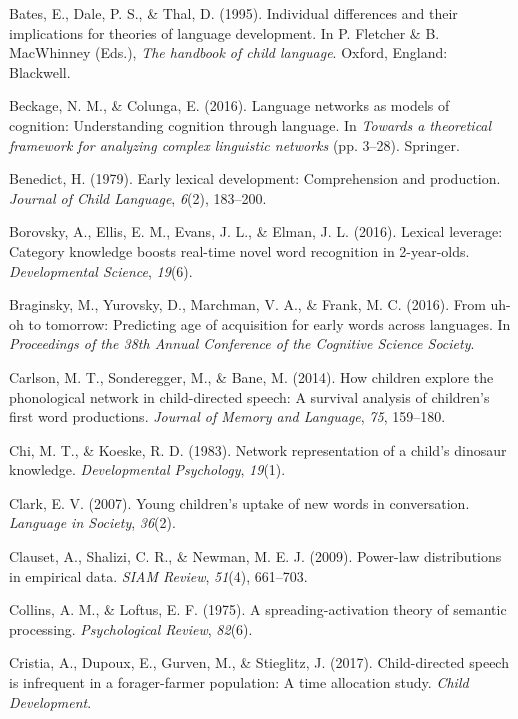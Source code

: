 \documentclass[english,floatsintext,man]{apa6}
\theoremstyle{definition}
\theoremstyle{definition}
\theoremstyle{definition}
\theoremstyle{remark}
\begin{document}
\hypertarget{ref-bates1995}{}
Bates, E., Dale, P. S., \& Thal, D. (1995). Individual differences and
their implications for theories of language development. In P. Fletcher
\& B. MacWhinney (Eds.), \emph{The handbook of child language}. Oxford,
England: Blackwell.

\hypertarget{ref-beckage2016}{}
Beckage, N. M., \& Colunga, E. (2016). Language networks as models of
cognition: Understanding cognition through language. In \emph{Towards a
theoretical framework for analyzing complex linguistic networks} (pp.
3--28). Springer.

\hypertarget{ref-benedict1979}{}
Benedict, H. (1979). Early lexical development: Comprehension and
production. \emph{Journal of Child Language}, \emph{6}(2), 183--200.

\hypertarget{ref-borovsky2016}{}
Borovsky, A., Ellis, E. M., Evans, J. L., \& Elman, J. L. (2016).
Lexical leverage: Category knowledge boosts real-time novel word
recognition in 2-year-olds. \emph{Developmental Science}, \emph{19}(6).

\hypertarget{ref-braginsky2016}{}
Braginsky, M., Yurovsky, D., Marchman, V. A., \& Frank, M. C. (2016).
From uh-oh to tomorrow: Predicting age of acquisition for early words
across languages. In \emph{Proceedings of the 38th Annual Conference of
the Cognitive Science Society}.

\hypertarget{ref-carlson2014}{}
Carlson, M. T., Sonderegger, M., \& Bane, M. (2014). How children
explore the phonological network in child-directed speech: A survival
analysis of children's first word productions. \emph{Journal of Memory
and Language}, \emph{75}, 159--180.

\hypertarget{ref-chi1983}{}
Chi, M. T., \& Koeske, R. D. (1983). Network representation of a child's
dinosaur knowledge. \emph{Developmental Psychology}, \emph{19}(1).

\hypertarget{ref-clark2007}{}
Clark, E. V. (2007). Young children's uptake of new words in
conversation. \emph{Language in Society}, \emph{36}(2).

\hypertarget{ref-clauset09}{}
Clauset, A., Shalizi, C. R., \& Newman, M. E. J. (2009). Power-law
distributions in empirical data. \emph{SIAM Review}, \emph{51}(4),
661--703.

\hypertarget{ref-collins1975}{}
Collins, A. M., \& Loftus, E. F. (1975). A spreading-activation theory
of semantic processing. \emph{Psychological Review}, \emph{82}(6).

\hypertarget{ref-cristia2017}{}
Cristia, A., Dupoux, E., Gurven, M., \& Stieglitz, J. (2017).
Child-directed speech is infrequent in a forager-farmer population: A
time allocation study. \emph{Child Development}.
\end{document}
